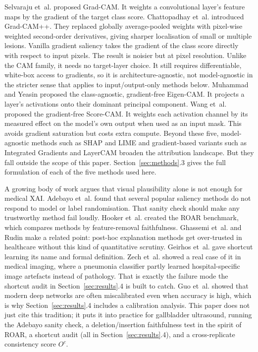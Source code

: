 Selvaraju et~al. \cite{ref11} proposed Grad-CAM. It weights a convolutional layer's feature maps by the gradient of the target class score. Chattopadhay et~al. \cite{ref12} introduced Grad-CAM++. They replaced globally average-pooled weights with pixel-wise weighted second-order derivatives, giving sharper localisation of small or multiple lesions. Vanilla gradient saliency \cite{ref33} takes the gradient of the class score directly with respect to input pixels. The result is noisier but at pixel resolution. Unlike the CAM family, it needs no target-layer choice. It still requires differentiable, white-box access to gradients, so it is architecture-agnostic, not model-agnostic in the stricter sense that applies to input/output-only methods below. Muhammad and Yeasin \cite{ref34} proposed the class-agnostic, gradient-free Eigen-CAM. It projects a layer's activations onto their dominant principal component. Wang et~al. \cite{ref35} proposed the gradient-free Score-CAM. It weights each activation channel by its measured effect on the model's own output when used as an input mask. This avoids gradient saturation but costs extra compute. Beyond these five, model-agnostic methods such as SHAP \cite{ref36} and LIME \cite{ref37} and gradient-based variants such as Integrated Gradients \cite{ref38} and LayerCAM \cite{ref39} broaden the attribution landscape. But they fall outside the scope of this paper. Section~\ref{sec:methods}.3 gives the full formulation of each of the five methods used here.

A growing body of work argues that visual plausibility alone is not enough for medical XAI. Adebayo et~al. \cite{ref13} found that several popular saliency methods do not respond to model or label randomisation. That sanity check should make any trustworthy method fail loudly. Hooker et~al. \cite{ref14} created the ROAR benchmark, which compares methods by feature-removal faithfulness. Ghassemi et~al. \cite{ref9} and Rudin \cite{ref8} make a related point: post-hoc explanation methods get over-trusted in healthcare without this kind of quantitative scrutiny. Geirhos et~al. \cite{ref40} gave shortcut learning its name and formal definition. Zech et~al. \cite{ref41} showed a real case of it in medical imaging, where a pneumonia classifier partly learned hospital-specific image artefacts instead of pathology. That is exactly the failure mode the shortcut audit in Section~\ref{sec:results}.4 is built to catch. Guo et~al. \cite{ref42} showed that modern deep networks are often miscalibrated even when accuracy is high, which is why Section~\ref{sec:results}.4 includes a calibration analysis. This paper does not just cite this tradition; it puts it into practice for gallbladder ultrasound, running the Adebayo sanity check, a deletion/insertion faithfulness test in the spirit of ROAR, a shortcut audit (all in Section~\ref{sec:results}.4), and a cross-replicate consistency score $O^c$.

